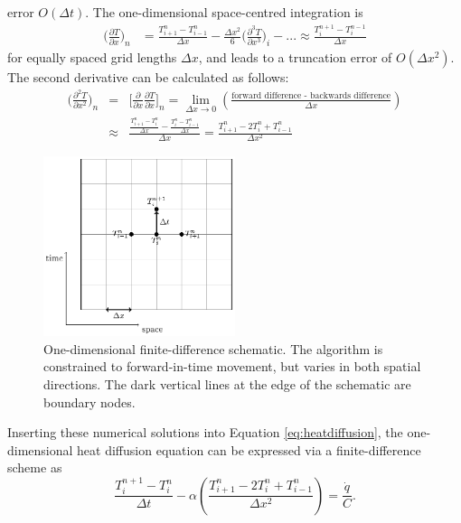 error $O(\Delta t)$. The one-dimensional space-centred integration 
is
\begin{align}
\bigg(\frac{\partial T}{\partial x}\bigg)_n &= \frac{T_{i+1}^{n} - T_{i-1}^{n}}{\Delta x} - \frac{\Delta x^2}{6}\bigg(\frac{\partial^3 T}{\partial x^3}\bigg)_i - ... \approx \frac{T_{i}^{n+1} - T_{i}^{n-1}}{\Delta x} 
\end{align}
for equally spaced grid lengths $\Delta x$, and leads to a truncation 
error of $O(\Delta x^2)$. The second derivative can be calculated 
as follows:
\begin{align}
\bigg(\frac{\partial^2 T}{\partial x^2}\bigg)_n &=& \bigg[ \frac{\partial}{\partial x} \frac{\partial T}{\partial x}\bigg]_n = \lim\limits_{\Delta x \to 0} \left(\frac{\text{forward difference - backwards difference}}{\Delta x}\right) \\
                                                                      &\approx& \frac{\frac{T_{i+1}^{n} - T_{i}^n}{\Delta x} - \frac{T_{i}^{n} - T_{i-1}^{n}}{\Delta x} }{\Delta x} = \frac{T_{i+1}^{n} - 2T_{i}^n + T_{i-1}^{n}}{\Delta x^2}
\end{align}
\begin{figure}[h]
	\centering
	\includegraphics[width=0.5\textwidth]{finitediff}
	\caption{One-dimensional finite-difference schematic. The algorithm is constrained to forward-in-time movement, but varies in both spatial directions. The dark vertical lines at the edge of the schematic are boundary nodes.}
	\label{fig:1DFD}
\end{figure}
Inserting these numerical solutions into Equation \ref{eq:heatdiffusion}, 
the one-dimensional heat diffusion equation can be expressed via a 
finite-difference scheme
 as
\begin{equation}
\frac{T_{i}^{n+1} - T_{i}^n}{\Delta t} - \alpha \left(\frac{T_{i+1}^{n} - 2T_{i}^n + T_{i-1}^{n}}{\Delta x^2}\right) = \frac{\dot{q}}{C}.
\end{equation}
